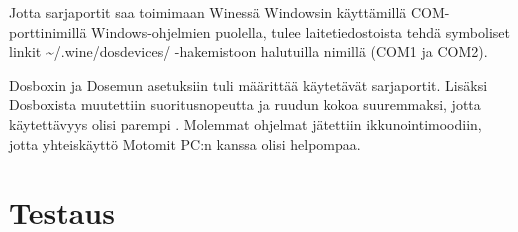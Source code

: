 Jotta sarjaportit saa toimimaan Winessä Windowsin käyttämillä COM-porttinimillä Windows-ohjelmien puolella, tulee laitetiedostoista tehdä symboliset linkit \textasciitilde{}/.wine/dosdevices/ -hakemistoon halutuilla nimillä (COM1 ja COM2).\cite[s. 21]{wine:manual}

Dosboxin ja Dosemun asetuksiin tuli määrittää käytetävät sarjaportit. Lisäksi Dosboxista muutettiin suoritusnopeutta ja ruudun kokoa suuremmaksi, jotta käytettävyys olisi parempi \cite{dosbox:conf}. Molemmat ohjelmat jätettiin ikkunointimoodiin, jotta yhteiskäyttö Motomit PC:n kanssa olisi helpompaa.


\section{Testaus}




